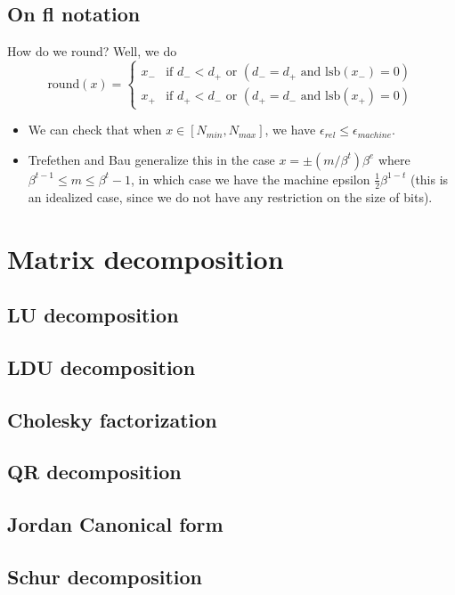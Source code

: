 \documentclass[11pt,reqno]{amsart}
\theoremstyle{remark}
\begin{document}
\subsection*{On fl notation}
How do we round? Well, we do
\[
\text{round}(x)=
\begin{cases} 
x_- & \text{if } d_- < d_+ \text{ or } (d_- = d_+ \text{ and } \text{lsb}(x_-) = 0) \\
x_+ & \text{if } d_+ < d_- \text{ or } (d_+ = d_- \text{ and } \text{lsb}(x_+) = 0)
\end{cases}
\]
\begin{itemize}
\item We can check that when $x\in [N_{min}, N_{max}]$, we have $\epsilon_{rel}\leq \epsilon_{machine}$.
\item Trefethen and Bau generalize this in the case $x=\pm (m/\beta^t)\beta^e$ where $\beta^{t-1}\leq m\leq \beta^t-1$, in which case we have the machine epsilon $\frac 12\beta^{1-t}$ (this is an idealized
 case, since we do not have any restriction on the size of bits).
\end{itemize}
\section{Matrix decomposition}
\subsection{LU decomposition}
\subsection{LDU decomposition}
\subsection{Cholesky factorization}
\subsection{QR decomposition}
\subsection{Jordan Canonical form}
\subsection{Schur decomposition}
\end{document}
